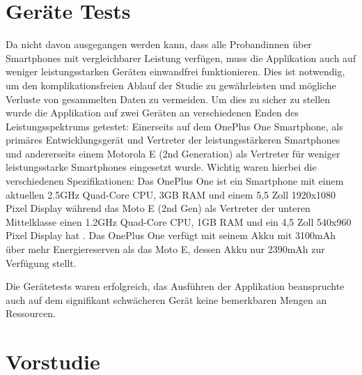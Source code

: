 \section{Geräte Tests}

Da nicht davon ausgegangen werden kann, dass alle Probandinnen über Smartphones mit vergleichbarer Leistung verfügen, muss die Applikation auch auf weniger leistungsstarken Geräten einwandfrei funktionieren.
Dies ist notwendig, um den komplikationsfreien Ablauf der Studie zu gewährleisten und mögliche Verluste von gesammelten Daten zu vermeiden.
Um dies zu sicher zu stellen wurde die Applikation auf zwei Geräten an verschiedenen Enden des Leistungsspektrums getestet:
Einerseits auf dem OnePlus One Smartphone, als primäres Entwicklungsgerät und Vertreter der leistungsstärkeren Smartphones und andererseits einem Motorola E (2nd Generation) als Vertreter für weniger leistungsstarke Smartphones eingesetzt wurde.
Wichtig waren hierbei die verschiedenen Spezifikationen:
Das OnePlus One ist ein Smartphone mit einem aktuellen 2.5GHz Quad-Core CPU, 3GB RAM und einem 5,5 Zoll 1920x1080 Pixel Display \cite{oneplusone}
während das Moto E (2nd Gen) als Vertreter der unteren Mittelklasse einen 1.2GHz Quad-Core CPU, 1GB RAM und ein 4,5 Zoll 540x960 Pixel Display hat \cite{motoe}.
Das OnePlus One verfügt mit seinem Akku mit 3100mAh über mehr Energiereserven als das Moto E, dessen Akku nur 2390mAh zur Verfügung stellt.
\par
Die Gerätetests waren erfolgreich, das Ausführen der Applikation beanspruchte auch auf dem signifikant schwächeren Gerät keine bemerkbaren Mengen an Ressourcen.



\section{Vorstudie}

